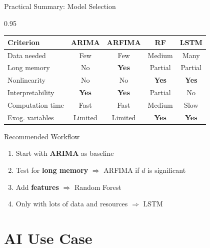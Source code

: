 \documentclass[9pt, aspectratio=169, t]{beamer}
\begin{document}
\begin{frame}{Practical Summary: Model Selection}
    \begin{cminipage}{0.95\textwidth}
    \begin{center}
    \begin{tabular}{l|c|c|c|c}
        \toprule
        \textbf{Criterion} & \textbf{ARIMA} & \textbf{ARFIMA} & \textbf{RF} & \textbf{LSTM} \\
        \midrule
        Data needed & Few & Few & Medium & Many \\
        Long memory & No & \textbf{Yes} & Partial & Partial \\
        Nonlinearity & No & No & \textbf{Yes} & \textbf{Yes} \\
        Interpretability & \textbf{Yes} & \textbf{Yes} & Partial & No \\
        Computation time & Fast & Fast & Medium & Slow \\
        Exog. variables & Limited & Limited & \textbf{Yes} & \textbf{Yes} \\
        \bottomrule
    \end{tabular}
    \end{center}

    \vspace{0.1cm}

    \begin{block}{Recommended Workflow}
        \begin{enumerate}\setlength{\itemsep}{0pt}
            \item Start with \textbf{ARIMA} as baseline
            \item Test for \textbf{long memory} $\Rightarrow$ ARFIMA if $d$ is significant
            \item Add \textbf{features} $\Rightarrow$ Random Forest
            \item Only with lots of data and resources $\Rightarrow$ LSTM
        \end{enumerate}
    \end{block}
    \end{cminipage}
\end{frame}

\section{AI Use Case}
\end{document}
